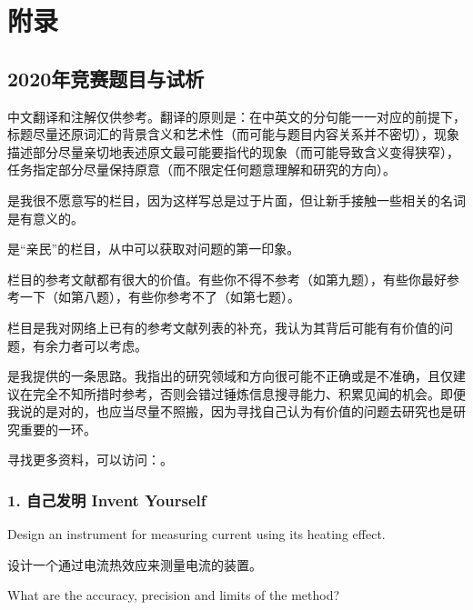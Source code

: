 \documentclass[a4paper,10pt,english]{sphinxmanual}
\begin{document}


\chapter{附录}
\label{\detokenize{7. Appendix:id1}}\label{\detokenize{7. Appendix::doc}}

\section{2020年竞赛题目与试析}
\label{\detokenize{7. Appendix:id2}}
中文翻译和注解仅供参考。翻译的原则是：在中英文的分句能一一对应的前提下，标题尽量还原词汇的背景含义和艺术性（而可能与题目内容关系并不密切），现象描述部分尽量亲切地表述原文最可能要指代的现象（而可能导致含义变得狭窄），任务指定部分尽量保持原意（而不限定任何题意理解和研究的方向）。

 是我很不愿意写的栏目，因为这样写总是过于片面，但让新手接触一些相关的名词是有意义的。

 是“亲民”的栏目，从中可以获取对问题的第一印象。

 栏目的参考文献都有很大的价值。有些你不得不参考（如第九题），有些你最好参考一下（如第八题），有些你参考不了（如第七题）。

 栏目是我对网络上已有的参考文献列表的补充，我认为其背后可能有有价值的问题，有余力者可以考虑。

 是我提供的一条思路。我指出的研究领域和方向很可能不正确或是不准确，且仅建议在完全不知所措时参考，否则会错过锤炼信息搜寻能力、积累见闻的机会。即便我说的是对的，也应当尽量不照搬，因为寻找自己认为有价值的问题去研究也是研究重要的一环。

寻找更多资料，可以访问：。


\subsection{1. 自己发明 Invent Yourself}
\label{\detokenize{7. Appendix:invent-yourself}}
Design an instrument for measuring current using its heating effect.

设计一个通过电流热效应来测量电流的装置。

What are the accuracy, precision and limits of the method?
\end{document}
